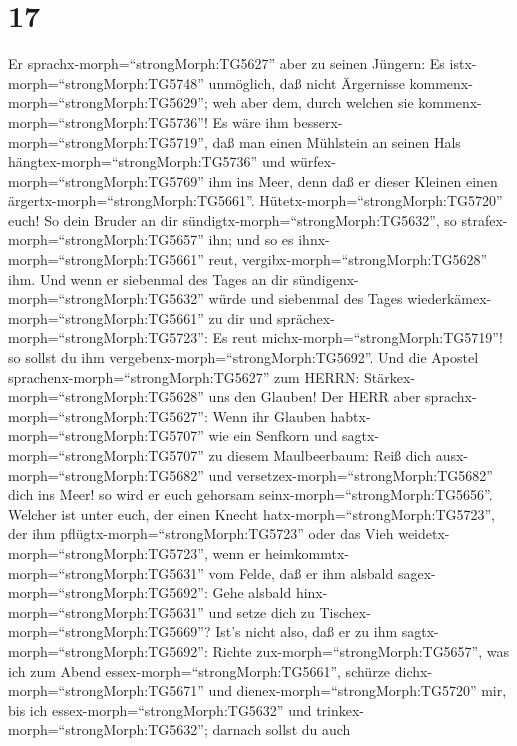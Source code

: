 \hypertarget{section-16}{%
\section{17}\label{section-16}}

 Er sprachx-morph=``strongMorph:TG5627'' aber zu seinen
Jüngern: Es istx-morph=``strongMorph:TG5748'' unmöglich, daß nicht
Ärgernisse kommenx-morph=``strongMorph:TG5629''; weh aber dem, durch
welchen sie kommenx-morph=``strongMorph:TG5736''!  Es wäre
ihm besserx-morph=``strongMorph:TG5719'', daß man einen Mühlstein an
seinen Hals hängtex-morph=``strongMorph:TG5736'' und
würfex-morph=``strongMorph:TG5769'' ihm ins Meer, denn daß er dieser
Kleinen einen ärgertx-morph=``strongMorph:TG5661''. 
Hütetx-morph=``strongMorph:TG5720'' euch! So dein Bruder an dir
sündigtx-morph=``strongMorph:TG5632'', so
strafex-morph=``strongMorph:TG5657'' ihn; und so es
ihnx-morph=``strongMorph:TG5661'' reut,
vergibx-morph=``strongMorph:TG5628'' ihm.  Und wenn er
siebenmal des Tages an dir sündigenx-morph=``strongMorph:TG5632'' würde
und siebenmal des Tages wiederkämex-morph=``strongMorph:TG5661'' zu dir
und sprächex-morph=``strongMorph:TG5723'': Es reut
michx-morph=``strongMorph:TG5719''! so sollst du ihm
vergebenx-morph=``strongMorph:TG5692''.  Und die Apostel
sprachenx-morph=``strongMorph:TG5627'' zum HERRN:
Stärkex-morph=``strongMorph:TG5628'' uns den Glauben!  Der
HERR aber sprachx-morph=``strongMorph:TG5627'': Wenn ihr Glauben
habtx-morph=``strongMorph:TG5707'' wie ein Senfkorn und
sagtx-morph=``strongMorph:TG5707'' zu diesem Maulbeerbaum: Reiß dich
ausx-morph=``strongMorph:TG5682'' und
versetzex-morph=``strongMorph:TG5682'' dich ins Meer! so wird er euch
gehorsam seinx-morph=``strongMorph:TG5656''.  Welcher ist
unter euch, der einen Knecht hatx-morph=``strongMorph:TG5723'', der ihm
pflügtx-morph=``strongMorph:TG5723'' oder das Vieh
weidetx-morph=``strongMorph:TG5723'', wenn er
heimkommtx-morph=``strongMorph:TG5631'' vom Felde, daß er ihm alsbald
sagex-morph=``strongMorph:TG5692'': Gehe alsbald
hinx-morph=``strongMorph:TG5631'' und setze dich zu
Tischex-morph=``strongMorph:TG5669''?  Ist's nicht also, daß
er zu ihm sagtx-morph=``strongMorph:TG5692'': Richte
zux-morph=``strongMorph:TG5657'', was ich zum Abend
essex-morph=``strongMorph:TG5661'', schürze
dichx-morph=``strongMorph:TG5671'' und
dienex-morph=``strongMorph:TG5720'' mir, bis ich
essex-morph=``strongMorph:TG5632'' und
trinkex-morph=``strongMorph:TG5632''; darnach sollst du auch
